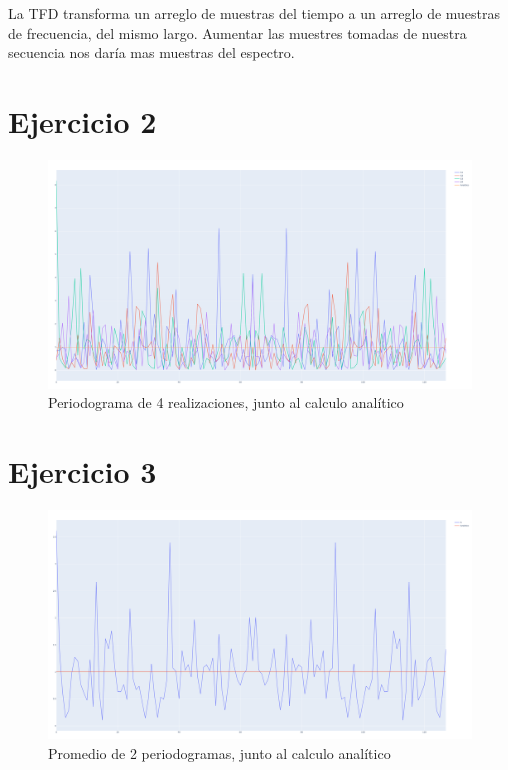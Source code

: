 \documentclass[12pt,letterpaper]{article}     %
\begin{document}
La TFD transforma un arreglo de muestras del tiempo a un arreglo de muestras de frecuencia, del mismo largo.
Aumentar las muestres tomadas de nuestra secuencia nos daría mas muestras del espectro.

\section{Ejercicio 2}

\begin{figure}[!ht]
\centering
\includegraphics[width=18cm]{imagenes/4RealizacionesyAnalitico.png}
\caption{Periodograma de 4 realizaciones, junto al calculo analítico}
\end{figure}

\clearpage
\section{Ejercicio 3}

\begin{figure}[!ht]
\centering
\includegraphics[width=18cm]{imagenes/PromedioN2.png}
\caption{Promedio de 2 periodogramas, junto al calculo analítico}
\end{figure}
\end{document}
